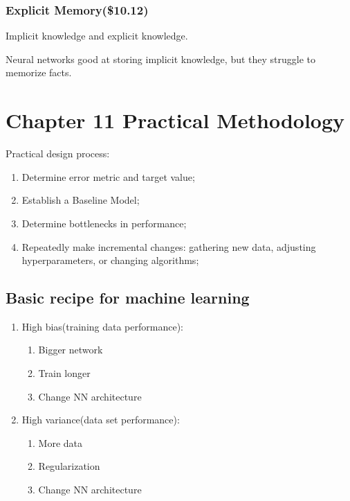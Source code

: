 \documentclass[12pt]{article}
\numberwithin{equation}{section}
\begin{document}
	\subsubsection{Explicit Memory(\$10.12)}
	Implicit knowledge and explicit knowledge. \par
	Neural networks good at storing implicit knowledge, but they struggle to memorize facts. \par
\section{Chapter 11 Practical Methodology}
Practical design process:
\begin{enumerate}
	\item Determine error metric and target value;
	\item Establish a Baseline Model;
	\item Determine bottlenecks in performance;
	\item Repeatedly make incremental changes: gathering new data, adjusting hyperparameters, or changing algorithms;
\end{enumerate}
\subsection{Basic recipe for machine learning}
\begin{enumerate}
	\item High bias(training data performance):\par
	\begin{enumerate}
		\item Bigger network
		\item Train longer
		\item Change NN architecture 
	\end{enumerate}
	\item High variance(data set performance):\par
	\begin{enumerate}
		\item More data
		\item Regularization
		\item Change NN architecture 
	\end{enumerate}	
\end{enumerate}
\end{document}
